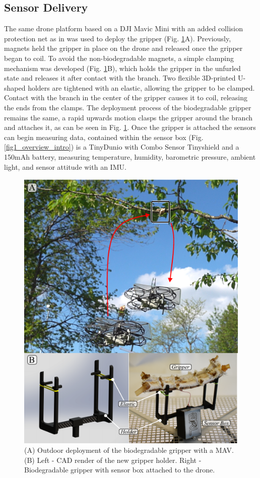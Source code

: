 \subsection{Sensor Delivery}
The same drone platform based on a DJI Mavic Mini with an added collision protection net as in \cite{Geckeler2022a} was used to deploy the gripper (Fig. \ref{fig7_outdoor}A). Previously, magnets held the gripper in place on the drone and released once the gripper began to coil. To avoid the non-biodegradable magnets, a simple clamping mechanism was developed (Fig. \ref{fig7_outdoor}B), which holds the gripper in the unfurled state and releases it after contact with the branch. Two flexible 3D-printed U-shaped holders are tightened with an elastic, allowing the gripper to be clamped. Contact with the branch in the center of the gripper causes it to coil, releasing the ends from the clamps. The deployment process of the biodegradable gripper remains the same, a rapid upwards motion clasps the gripper around the branch and attaches it, as can be seen in Fig. \ref{fig7_outdoor}. Once the gripper is attached the sensors can begin measuring data, contained within the sensor box (Fig. \ref{fig1_overview_intro}) is a TinyDunio with Combo Sensor Tinyshield and a 150mAh battery, measuring temperature, humidity, barometric pressure, ambient light, and sensor attitude with an IMU.
\begin{figure}[!t]
\centering
\includegraphics[width=1\columnwidth]{chapters/papers/BOG/figures/figure7-outdoor/figure7-outdoor.pdf}
\caption{(A) Outdoor deployment of the biodegradable gripper with a MAV. (B) Left - CAD render of the new gripper holder. Right - Biodegradable gripper with sensor box attached to the drone.}
\label{fig7_outdoor}
\end{figure}

